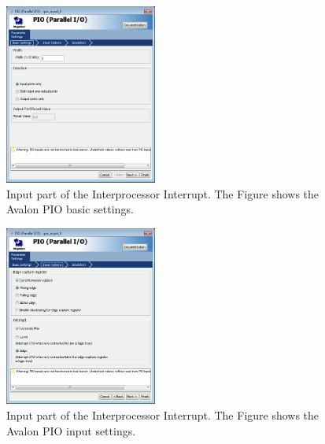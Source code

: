 \begin{enumerate}
\begin{figure}
  \begin{center}
    \includegraphics[width=5cm, bb=0 0 518
    614]{images/IPIC_PIO_in_dialogbox_basic.png}
  \end{center}
  \caption{Input part of the Interprocessor 
    Interrupt. The Figure shows the Avalon PIO basic settings.}
  \label{fig:IPIC-input-basic}
\end{figure}

\begin{figure}
  \begin{center}
    \includegraphics[width=5cm, bb=0 0 518
    613]{images/IPIC_PIO_in_dialogbox_input.png}
  \end{center}
  \caption{Input part of the Interprocessor Interrupt. 
    The Figure shows the Avalon PIO input settings.}
  \label{fig:IPIC-input-input}
\end{figure}


\end{enumerate}
